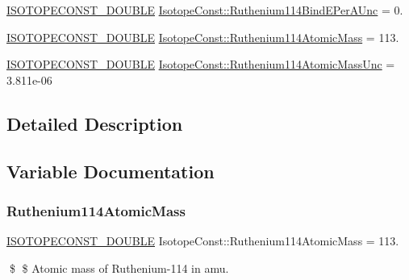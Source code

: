 \begin{DoxyCompactItemize}
\mbox{\hyperlink{group___isotope_const-_macros_ga8f45a7272ce02c0b4c65c44636ed719a}{I\+S\+O\+T\+O\+P\+E\+C\+O\+N\+S\+T\+\_\+\+D\+O\+U\+B\+LE}} \mbox{\hyperlink{group___isotope_const-_ruthenium-_ru114_ga0ef82fc8290150be0eb74815f38cd2a4}{Isotope\+Const\+::\+Ruthenium114\+Bind\+E\+Per\+A\+Unc}} = 0.
\item 
\mbox{\hyperlink{group___isotope_const-_macros_ga8f45a7272ce02c0b4c65c44636ed719a}{I\+S\+O\+T\+O\+P\+E\+C\+O\+N\+S\+T\+\_\+\+D\+O\+U\+B\+LE}} \mbox{\hyperlink{group___isotope_const-_ruthenium-_ru114_ga8a8c83d2e83c3dfa3bc14e9815509671}{Isotope\+Const\+::\+Ruthenium114\+Atomic\+Mass}} = 113.
\item 
\mbox{\hyperlink{group___isotope_const-_macros_ga8f45a7272ce02c0b4c65c44636ed719a}{I\+S\+O\+T\+O\+P\+E\+C\+O\+N\+S\+T\+\_\+\+D\+O\+U\+B\+LE}} \mbox{\hyperlink{group___isotope_const-_ruthenium-_ru114_ga3a125a32f5282de997cf5a2fa8c0e862}{Isotope\+Const\+::\+Ruthenium114\+Atomic\+Mass\+Unc}} = 3.\+811e-\/06
\end{DoxyCompactItemize}


\subsection{Detailed Description}


\subsection{Variable Documentation}
\mbox{\label{group___isotope_const-_ruthenium-_ru114_ga8a8c83d2e83c3dfa3bc14e9815509671}} 
\subsubsection{\texorpdfstring{Ruthenium114\+Atomic\+Mass}{Ruthenium114AtomicMass}}
{\footnotesize\ttfamily \mbox{\hyperlink{group___isotope_const-_macros_ga8f45a7272ce02c0b4c65c44636ed719a}{I\+S\+O\+T\+O\+P\+E\+C\+O\+N\+S\+T\+\_\+\+D\+O\+U\+B\+LE}} Isotope\+Const\+::\+Ruthenium114\+Atomic\+Mass = 113.}

\$ \$ Atomic mass of Ruthenium-\/114 in amu. \mbox{\label{group___isotope_const-_ruthenium-_ru114_ga3a125a32f5282de997cf5a2fa8c0e862}} 

